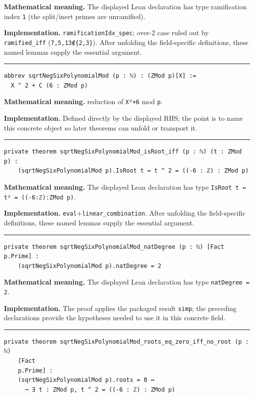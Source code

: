 \documentclass[UTF8,a4paper,11pt,fontset=fandol]{ctexart}
\theoremstyle{definition}
\newcommand{\statementsep}{\par\medskip\hrule\medskip}
\begin{document}
\noindent\textbf{Mathematical meaning.} The displayed Lean declaration has type ramification index \texttt{1} (the split/inert primes are unramified).\par
\noindent\textbf{Implementation.} \texttt{ramificationIdx\_\allowbreak{}spec}; over-2 case ruled out by \texttt{ramified\_\allowbreak{}iff} (\texttt{7,5,13∉\{2,3\}}). After unfolding the field-specific definitions, these named lemmas supply the essential argument.\par
\statementsep
\begin{verbatim}
abbrev sqrtNegSixPolynomialMod (p : ℕ) : (ZMod p)[X] :=
  X ^ 2 + C (6 : ZMod p)
\end{verbatim}
\noindent\textbf{Mathematical meaning.} reduction of \texttt{X²+6} mod \texttt{p}.\par
\noindent\textbf{Implementation.} Defined directly by the displayed RHS; the point is to name this concrete object so later theorems can unfold or transport it.\par
\statementsep
\begin{verbatim}
private theorem sqrtNegSixPolynomialMod_isRoot_iff (p : ℕ) (t : ZMod p) :
    (sqrtNegSixPolynomialMod p).IsRoot t ↔ t ^ 2 = ((-6 : ℤ) : ZMod p)
\end{verbatim}
\noindent\textbf{Mathematical meaning.} The displayed Lean declaration has type \texttt{IsRoot t ↔ t² = ((-6:ℤ):ZMod p)}.\par
\noindent\textbf{Implementation.} \texttt{eval}+\texttt{linear\_\allowbreak{}combination}. After unfolding the field-specific definitions, these named lemmas supply the essential argument.\par
\statementsep
\begin{verbatim}
private theorem sqrtNegSixPolynomialMod_natDegree (p : ℕ) [Fact p.Prime] :
    (sqrtNegSixPolynomialMod p).natDegree = 2
\end{verbatim}
\noindent\textbf{Mathematical meaning.} The displayed Lean declaration has type \texttt{natDegree = 2}.\par
\noindent\textbf{Implementation.} The proof applies the packaged result \texttt{simp}; the preceding declarations provide the hypotheses needed to use it in this concrete field.\par
\statementsep
\begin{verbatim}
private theorem sqrtNegSixPolynomialMod_roots_eq_zero_iff_no_root (p : ℕ)
    [Fact
    p.Prime] :
    (sqrtNegSixPolynomialMod p).roots = 0 ↔
      ¬ ∃ t : ZMod p, t ^ 2 = ((-6 : ℤ) : ZMod p)
\end{verbatim}
\end{document}
